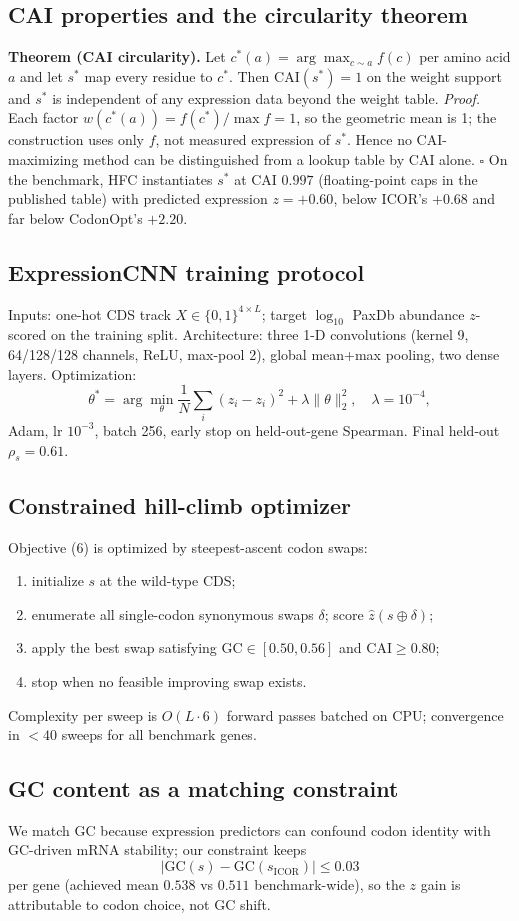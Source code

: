 \subsection{CAI properties and the circularity theorem}
\textbf{Theorem (CAI circularity).} Let $c^*(a)=\arg\max_{c\sim a} f(c)$ per amino acid $a$ and let $s^*$ map every residue to $c^*$. Then $\mathrm{CAI}(s^*)=1$ on the weight support and $s^*$ is independent of any expression data beyond the weight table.
\emph{Proof.} Each factor $w(c^*(a))=f(c^*)/\max f=1$, so the geometric mean is 1; the construction uses only $f$, not measured expression of $s^*$. Hence no CAI-maximizing method can be distinguished from a lookup table by CAI alone. $\square$
On the benchmark, HFC instantiates $s^*$ at CAI $0.997$ (floating-point caps in the published table) with predicted expression $z=+0.60$, below ICOR's $+0.68$ and far below CodonOpt's $+2.20$.
\subsection{ExpressionCNN training protocol}
Inputs: one-hot CDS track $X\in\{0,1\}^{4\times L}$; target $\log_{10}$ PaxDb abundance $z$-scored on the training split. Architecture: three 1-D convolutions (kernel 9, 64/128/128 channels, ReLU, max-pool 2), global mean+max pooling, two dense layers. Optimization:
\begin{equation}
\theta^*=\arg\min_\theta \frac1N\sum_i \left(\hat z_i-z_i\right)^2+\lambda\lVert\theta\rVert_2^2,\quad \lambda=10^{-4},
\end{equation}
Adam, lr $10^{-3}$, batch 256, early stop on held-out-gene Spearman. Final held-out $\rho_s=0.61$.
\subsection{Constrained hill-climb optimizer}
Objective (6) is optimized by steepest-ascent codon swaps:
\begin{enumerate}
\item initialize $s$ at the wild-type CDS;
\item enumerate all single-codon synonymous swaps $\delta$; score $\hat z(s\oplus\delta)$;
\item apply the best swap satisfying $\mathrm{GC}\in[0.50,0.56]$ and $\mathrm{CAI}\ge0.80$;
\item stop when no feasible improving swap exists.
\end{enumerate}
Complexity per sweep is $O(L\cdot 6)$ forward passes batched on CPU; convergence in $<40$ sweeps for all benchmark genes.
\subsection{GC content as a matching constraint}
We match GC because expression predictors can confound codon identity with GC-driven mRNA stability; our constraint keeps
\begin{equation}
\left|\mathrm{GC}(s)-\mathrm{GC}(s_{\mathrm{ICOR}})\right|\le 0.03
\end{equation}
per gene (achieved mean $0.538$ vs $0.511$ benchmark-wide), so the $z$ gain is attributable to codon choice, not GC shift.
